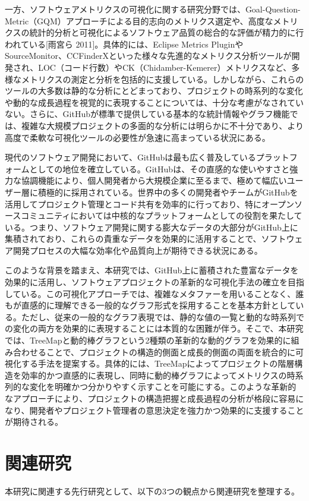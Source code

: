 \documentclass[12pt,twoside]{jbook}
\begin{document}
一方、ソフトウェアメトリクスの可視化に関する研究分野では、Goal-Question-Metric（GQM）アプローチによる目的志向のメトリクス選定や、高度なメトリクスの統計的分析と可視化によるソフトウェア品質の総合的な評価が精力的に行われている[雨宮ら 2011]。具体的には、Eclipse Metrics PluginやSourceMonitor、CCFinderXといった様々な先進的なメトリクス分析ツールが開発され、LOC（コード行数）やCK（Chidamber-Kemerer）メトリクスなど、多様なメトリクスの測定と分析を包括的に支援している。しかしながら、これらのツールの大多数は静的な分析にとどまっており、プロジェクトの時系列的な変化や動的な成長過程を視覚的に表現することについては、十分な考慮がなされていない。さらに、GitHubが標準で提供している基本的な統計情報やグラフ機能では、複雑な大規模プロジェクトの多面的な分析には明らかに不十分であり、より高度で柔軟な可視化ツールの必要性が急速に高まっている状況にある。

現代のソフトウェア開発において、GitHubは最も広く普及しているプラットフォームとしての地位を確立している。GitHubは、その直感的な使いやすさと強力な協調機能により、個人開発者から大規模企業に至るまで、極めて幅広いユーザー層に積極的に採用されている。世界中の多くの開発者やチームがGitHubを活用してプロジェクト管理とコード共有を効率的に行っており、特にオープンソースコミュニティにおいては中核的なプラットフォームとしての役割を果たしている。つまり、ソフトウェア開発に関する膨大なデータの大部分がGitHub上に集積されており、これらの貴重なデータを効果的に活用することで、ソフトウェア開発プロセスの大幅な効率化や品質向上が期待できる状況にある。

このような背景を踏まえ、本研究では、GitHub上に蓄積された豊富なデータを効果的に活用し、ソフトウェアプロジェクトの革新的な可視化手法の確立を目指している。この可視化アプローチでは、複雑なメタファーを用いることなく、誰もが直感的に理解できる一般的なグラフ形式を採用することを基本方針としている。ただし、従来の一般的なグラフ表現では、静的な値の一覧と動的な時系列での変化の両方を効果的に表現することには本質的な困難が伴う。そこで、本研究では、TreeMapと動的棒グラフという2種類の革新的な動的グラフを効果的に組み合わせることで、プロジェクトの構造的側面と成長的側面の両面を統合的に可視化する手法を提案する。具体的には、TreeMapによってプロジェクトの階層構造を効率的かつ直感的に表現し、同時に動的棒グラフによってメトリクスの時系列的な変化を明確かつ分かりやすく示すことを可能にする。このような革新的なアプローチにより、プロジェクトの構造把握と成長過程の分析が格段に容易になり、開発者やプロジェクト管理者の意思決定を強力かつ効果的に支援することが期待される。


\chapter{関連研究}
本研究に関連する先行研究として、以下の3つの観点から関連研究を整理する。
\end{document}

